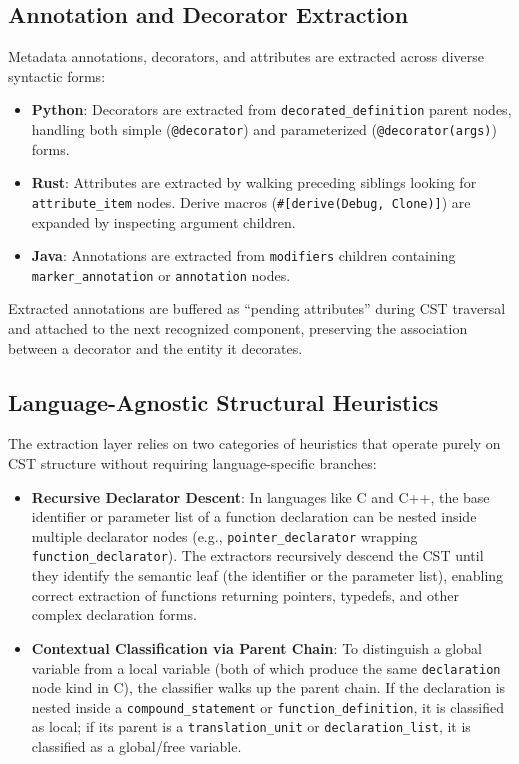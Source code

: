 \subsection{Annotation and Decorator Extraction}

Metadata annotations, decorators, and attributes are extracted across diverse syntactic forms:
\begin{itemize}
  \item \textbf{Python}: Decorators are extracted from \texttt{decorated\_definition} parent nodes, handling both simple (\texttt{@decorator}) and parameterized (\texttt{@decorator(args)}) forms.
  \item \textbf{Rust}: Attributes are extracted by walking preceding siblings looking for \texttt{attribute\_item} nodes. Derive macros (\texttt{\#[derive(Debug, Clone)]}) are expanded by inspecting argument children.
  \item \textbf{Java}: Annotations are extracted from \texttt{modifiers} children containing \texttt{marker\_annotation} or \texttt{annotation} nodes.
\end{itemize}

Extracted annotations are buffered as ``pending attributes'' during CST traversal and attached to the next recognized component, preserving the association between a decorator and the entity it decorates.

\subsection{Language-Agnostic Structural Heuristics}

The extraction layer relies on two categories of heuristics that operate purely on CST structure without requiring language-specific branches:

\begin{itemize}
  \item \textbf{Recursive Declarator Descent}: In languages like C and C++, the base identifier or parameter list of a function declaration can be nested inside multiple declarator nodes (e.g., \texttt{pointer\_declarator} wrapping \texttt{function\_declarator}). The extractors recursively descend the CST until they identify the semantic leaf (the identifier or the parameter list), enabling correct extraction of functions returning pointers, typedefs, and other complex declaration forms.
  \item \textbf{Contextual Classification via Parent Chain}: To distinguish a global variable from a local variable (both of which produce the same \texttt{declaration} node kind in C), the classifier walks up the parent chain. If the declaration is nested inside a \texttt{compound\_statement} or \texttt{function\_definition}, it is classified as local; if its parent is a \texttt{translation\_unit} or \texttt{declaration\_list}, it is classified as a global/free variable.
\end{itemize}

